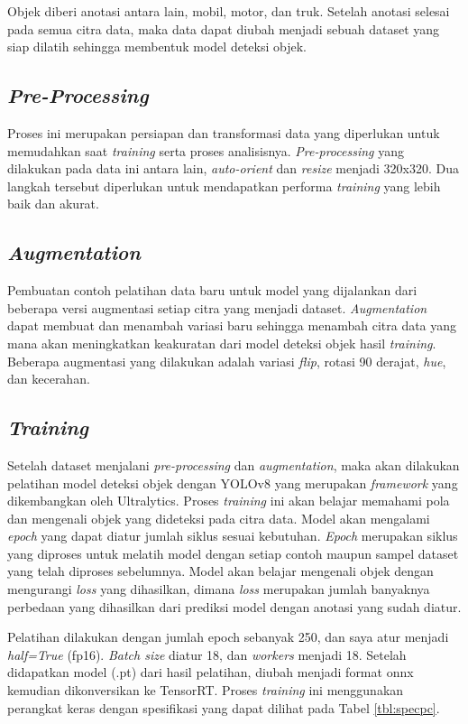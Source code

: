 Objek diberi anotasi antara lain, mobil, motor, dan truk. Setelah anotasi selesai pada semua citra data, maka data dapat diubah menjadi sebuah dataset yang siap dilatih sehingga membentuk model deteksi objek.

\subsection{\emph{Pre-Processing}}
Proses ini merupakan persiapan dan transformasi data yang diperlukan untuk memudahkan saat \emph{training} serta proses analisisnya. \emph{Pre-processing} yang dilakukan pada data ini antara lain, \emph{auto-orient} dan \emph{resize} menjadi 320x320. Dua langkah tersebut diperlukan untuk mendapatkan performa \emph{training} yang lebih baik dan akurat.

\subsection{\emph{Augmentation}}
Pembuatan contoh pelatihan data baru untuk model yang dijalankan dari beberapa versi augmentasi setiap citra yang menjadi dataset. \emph{Augmentation} dapat membuat dan menambah variasi baru sehingga menambah citra data yang mana akan meningkatkan keakuratan dari model deteksi objek hasil \emph{training}. Beberapa augmentasi yang dilakukan adalah variasi \emph{flip}, rotasi 90 derajat, \emph{hue}, dan kecerahan.

\subsection{\emph{Training}}
Setelah dataset menjalani \emph{pre-processing} dan \emph{augmentation}, maka akan dilakukan pelatihan model deteksi objek dengan YOLOv8 yang merupakan \emph{framework} yang dikembangkan oleh Ultralytics. Proses \emph{training} ini akan belajar memahami pola dan mengenali objek yang dideteksi pada citra data. Model akan mengalami \emph{epoch} yang dapat diatur jumlah siklus sesuai kebutuhan. \emph{Epoch} merupakan siklus yang diproses untuk melatih model dengan setiap contoh maupun sampel dataset yang telah diproses sebelumnya. Model akan belajar mengenali objek dengan mengurangi \emph{loss} yang dihasilkan, dimana \emph{loss} merupakan jumlah banyaknya perbedaan yang dihasilkan dari prediksi model dengan anotasi yang sudah diatur. 

Pelatihan dilakukan dengan jumlah epoch sebanyak 250, dan saya atur menjadi \emph{half=True} (fp16). \emph{Batch size} diatur 18, dan \emph{workers} menjadi 18. Setelah didapatkan model (.pt) dari hasil pelatihan, diubah menjadi format onnx kemudian dikonversikan ke TensorRT. Proses \emph{training} ini menggunakan perangkat keras dengan spesifikasi yang dapat dilihat pada Tabel \ref{tbl:specpc}.

